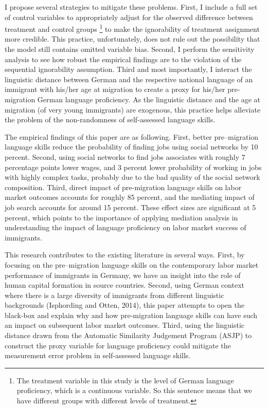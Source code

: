 \documentclass[12pt,a4paper]{article}
\begin{document}
I propose several strategies to mitigate these problems. First, I include a full set of control variables to appropriately adjust for the observed difference between treatment and control groups \footnote{The treatment variable in this study is the level of German language proficiency, which is a continuous variable. So this sentence means that we have different groups with different levels of treatment.} to make the ignorability of treatment assignment more credible. This practice, unfortunately, does not rule out the possibility that the model still contains omitted variable bias. Second, I perform the sensitivity analysis to see how robust the empirical findings are to the violation of the sequential ignorability assumption. Third and most importantly, I interact the linguistic distance between German and the respective national language of an immigrant with his/her age at migration to create a proxy for his/her pre-migration German language proficiency. As the linguistic distance and the age at migration (of very young immigrants) are exogenous, this practice helps alleviate the problem of the non-randomness of self-assessed language skills.

The empirical findings of this paper are as following. First, better pre--migration language skills reduce the probability of finding jobs using social networks by 10 percent. Second, using social networks to find jobs associates with roughly 7 percentage points lower wages, and 3 percent lower probability of working in jobs with highly complex tasks, probably due to the bad quality of the social network composition. Third, direct impact of pre-migration language skills on labor market outcomes accounts for roughly 85 percent, and the mediating impact of job search accounts for around 15 percent. These effect sizes are significant at 5 percent, which points to the importance of applying mediation analysis in understanding the impact of language proficiency on labor market success of immigrants.

This research contributes to the existing literature in several ways. First, by focusing on the pre--migration language skills on the contemporary labor market performance of immigrants in Germany, we have an insight into the role of human capital formation in source countries. Second, using German context where there is a large diversity of immigrants from different linguistic backgrounds (Isphording and Otten, 2014), this paper attempts to open the black-box and explain why and how pre-migration language skills can have such an impact on subsequent labor market outcomes. Third, using the linguistic distance drawn from the Automatic Similarity Judgement Program (ASJP) to construct the proxy variable for language proficiency could mitigate the measurement error problem in self-assessed language skills.
\end{document}
